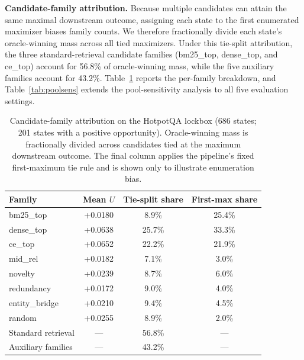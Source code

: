 \documentclass[10pt]{article}
\newcommand{\stitle}[1]{\vspace{0.4em}\noindent\textbf{#1}\hspace{0.6em}}
\begin{document}
\stitle{Candidate-family attribution.}
Because multiple candidates can attain the same maximal downstream outcome,
assigning each state to the first enumerated maximizer biases family
counts. We therefore fractionally divide each state's oracle-winning mass
across all tied maximizers. Under this tie-split attribution, the three
standard-retrieval candidate families (bm25\_top, dense\_top, and ce\_top)
account for 56.8\% of oracle-winning mass, while the five auxiliary
families account for 43.2\%. Table~\ref{tab:family} reports the per-family
breakdown, and Table~\ref{tab:poolsens} extends the pool-sensitivity
analysis to all five evaluation settings.

\begin{table}[h]
\centering
\small
\caption{Candidate-family attribution on the HotpotQA lockbox (686 states;
201 states with a positive opportunity). Oracle-winning mass is fractionally
divided across candidates tied at the maximum downstream outcome. The final
column applies the pipeline's fixed first-maximum tie rule and is shown only
to illustrate enumeration bias.}
\label{tab:family}
\begin{tabular}{lccc}
\toprule
\textbf{Family} & \textbf{Mean $U$} & \textbf{Tie-split share} &
\textbf{First-max share} \\
\midrule
bm25\_top      & +0.0180 & 8.9\%  & 25.4\% \\
dense\_top     & +0.0638 & 25.7\% & 33.3\% \\
ce\_top        & +0.0652 & 22.2\% & 21.9\% \\
mid\_rel       & +0.0182 & 7.1\%  & 3.0\% \\
novelty        & +0.0239 & 8.7\%  & 6.0\% \\
redundancy     & +0.0172 & 9.0\%  & 4.0\% \\
entity\_bridge & +0.0210 & 9.4\%  & 4.5\% \\
random         & +0.0255 & 8.9\%  & 2.0\% \\
Standard retrieval & --- & 56.8\% & --- \\
Auxiliary families & --- & 43.2\% & --- \\
\bottomrule
\end{tabular}
\end{table}
\end{document}
